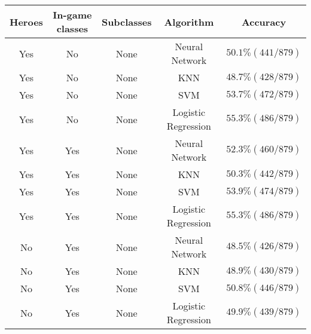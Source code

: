 \documentclass[11pt,letterpaper]{article}
\begin{document}
\begin{tabular}{c|c|c|c|c}
\textbf{Heroes} & \textbf{In-game classes} & \textbf{Subclasses} & \textbf{Algorithm} & \textbf{Accuracy} \\
\hline
Yes & No & None & Neural Network & $50.1\% (441/879)$ \\
Yes & No & None & KNN & $48.7\% (428/879)$ \\
Yes & No & None & SVM & $53.7\% (472/879)$ \\
Yes & No & None & Logistic Regression & $55.3\% (486/879)$ \\

Yes & Yes & None & Neural Network & $52.3\% (460/879)$ \\
Yes & Yes & None & KNN & $50.3\% (442/879)$ \\
Yes & Yes & None & SVM & $53.9\% (474/879)$ \\
Yes & Yes & None & Logistic Regression & $55.3\% (486/879)$ \\

No & Yes & None & Neural Network & $48.5\% (426/879)$ \\
No & Yes & None & KNN & $48.9\% (430/879)$ \\
No & Yes & None & SVM & $50.8\% (446/879)$ \\
No & Yes & None & Logistic Regression & $49.9\% (439/879)$ \\
\end{tabular}
\end{document}

